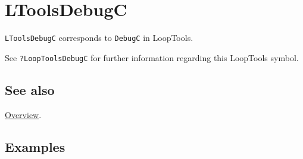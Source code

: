 \documentclass[../FeynHelpersManual.tex]{subfiles}
\begin{document}
\hypertarget{ltoolsdebugc}{
\section{LToolsDebugC}\label{ltoolsdebugc}}

\texttt{LToolsDebugC} corresponds to \texttt{DebugC} in LoopTools.

See \texttt{?LoopTools\textasciigrave DebugC} for further information
regarding this LoopTools symbol.

\subsection{See also}

\hyperlink{toc}{Overview}.

\subsection{Examples}
\end{document}
